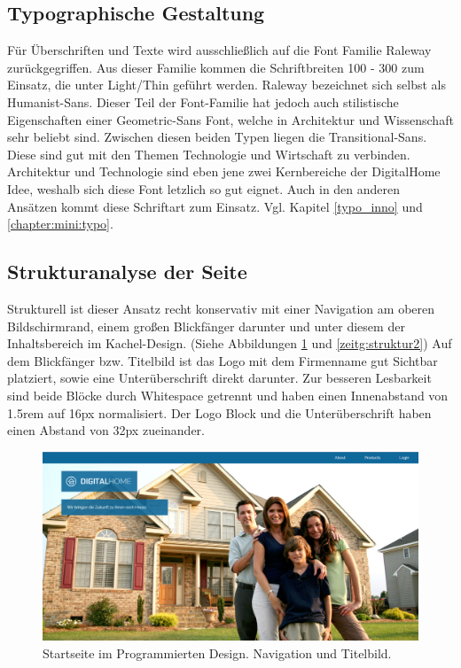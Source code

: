 \subsection{Typographische Gestaltung}
Für Überschriften und Texte wird ausschließlich auf die Font Familie Raleway zurückgegriffen. Aus dieser Familie kommen die Schriftbreiten 100 - 300 zum Einsatz, die unter Light/Thin geführt werden. Raleway bezeichnet sich selbst als Humanist-Sans. Dieser Teil der Font-Familie hat jedoch auch stilistische Eigenschaften einer Geometric-Sans Font, welche in Architektur und Wissenschaft sehr beliebt sind. Zwischen diesen beiden Typen liegen die Transitional-Sans. Diese sind gut mit den Themen Technologie und Wirtschaft zu verbinden. Architektur und Technologie sind eben jene zwei Kernbereiche der DigitalHome Idee, weshalb sich diese Font letzlich so gut eignet.
Auch in den anderen Ansätzen kommt diese Schriftart zum Einsatz. Vgl. Kapitel \ref{typo_inno} und \ref{chapter:mini:typo}.

\subsection{Strukturanalyse der Seite}\label{zeitg:struktur}
Strukturell ist dieser Ansatz recht konservativ mit einer Navigation am oberen Bildschirmrand, einem großen Blickfänger darunter und unter diesem der Inhaltsbereich im Kachel-Design. (Siehe Abbildungen \ref{zeitg:struktur1} und \ref{zeitg:struktur2})
Auf dem Blickfänger bzw. Titelbild ist das Logo mit dem Firmenname gut Sichtbar platziert, sowie eine Unterüberschrift direkt darunter. Zur besseren Lesbarkeit sind beide Blöcke durch Whitespace getrennt und haben einen Innenabstand von 1.5rem auf 16px normalisiert. Der Logo Block und die Unterüberschrift haben einen Abstand von 32px zueinander.

\begin{figure} [hp]
	\includegraphics[width=\textwidth]{./img/zeitg_struktur1.png}
	\caption{Startseite im Programmierten Design. Navigation und Titelbild.}
	\label{zeitg:struktur1}
\end{figure}

